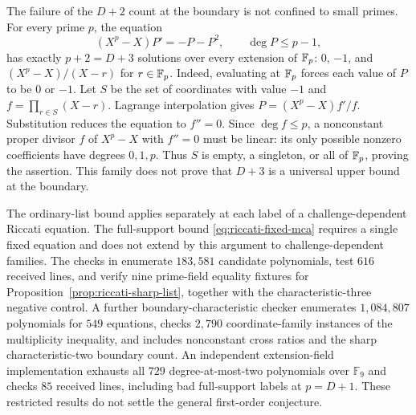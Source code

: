 The failure of the $D+2$ count at the boundary is not confined to
small primes. For every prime $p$, the equation
\[
 (X^p-X)P'=-P-P^2,\qquad \deg P\le p-1,
\]
has exactly $p+2=D+3$ solutions over every extension of $\mathbb F_p$:
$0$, $-1$, and $(X^p-X)/(X-r)$ for $r\in\mathbb F_p$.
Indeed, evaluating at $\mathbb F_p$ forces each value of $P$ to be $0$
or $-1$. Let $S$ be the set of coordinates with value $-1$ and
$f=\prod_{r\in S}(X-r)$. Lagrange interpolation gives
$P=(X^p-X)f'/f$. Substitution reduces the equation to $f''=0$.
Since $\deg f\le p$, a nonconstant proper divisor $f$ of $X^p-X$
with $f''=0$ must be linear: its only possible nonzero coefficients
have degrees $0,1,p$. Thus $S$ is empty, a singleton, or all of
$\mathbb F_p$, proving the assertion. This family does not prove that
$D+3$ is a universal upper bound at the boundary.

The ordinary-list bound applies separately at each label of a
challenge-dependent Riccati equation. The full-support bound
\eqref{eq:riccati-fixed-mca} requires a single fixed equation and
does not extend by this argument to challenge-dependent families.
The checks in  enumerate
$183{,}581$ candidate polynomials, test $616$ received lines, and
verify nine prime-field equality fixtures for
Proposition~\ref{prop:riccati-sharp-list}, together with the
characteristic-three negative control. A further boundary-characteristic
checker enumerates $1{,}084{,}807$ polynomials for $549$ equations,
checks $2{,}790$ coordinate-family instances of the multiplicity
inequality, and includes nonconstant cross ratios and the sharp
characteristic-two boundary count. An independent extension-field
implementation exhausts all $729$ degree-at-most-two polynomials
over $\mathbb F_9$ and checks $85$ received lines, including bad
full-support labels at $p=D+1$. These restricted results
do not settle the general first-order conjecture.
